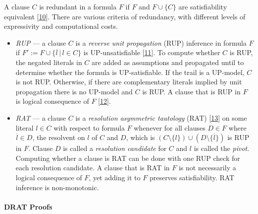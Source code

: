 \documentclass[
]{report}
\begin{document}
A clause \(C\) is redundant in a formula \(F\) if \(F\) and
\(F \cup \{C\}\) are satisfiability equivalent
{[}\protect\hyperlink{ref-DBLP:confux2fcadeux2fHeuleKB17}{10}{]}. There
are various criteria of redundancy, with different levels of
expressivity and computational costs.

\begin{itemize}
\item
  \emph{RUP} --- a clause \(C\) is a \emph{reverse unit propagation}
  (RUP) inference in formula \(F\) if
  \(F' := F \cup \{ \overline{l} \,|\, l \in C \}\) is UP-unsatisfiable
  {[}\protect\hyperlink{ref-DBLP:confux2fdateux2fGoldbergN03}{11}{]}. To
  compute whether \(C\) is RUP, the negated literals in \(C\) are added
  as assumptions and propagated until to determine whether the formula
  is UP-satisfiable. If the trail is a UP-model, \(C\) is not RUP.
  Otherwise, if there are complementary literals implied by unit
  propagation there is no UP-model and \(C\) is RUP. A clause that is
  RUP in \(F\) is logical consequence of \(F\)
  {[}\protect\hyperlink{ref-DBLP:confux2fisaimux2fGelder08}{12}{]}.
\item
  \emph{RAT} --- a clause \(C\) is a \emph{resolution asymmetric
  tautology} (RAT)
  {[}\protect\hyperlink{ref-DBLP:confux2fcadeux2fJarvisaloHB12}{13}{]}
  on some literal \(l \in C\) with respect to formula \(F\) whenever for
  all clauses \(D \in F\) where \(\overline{l} \in D\), the resolvent on
  \(l\) of \(C\) and \(D\), which is
  \((C \setminus \{l\}) \cup (D \setminus \{\overline{l}\})\) is RUP in
  \(F\). Clause \(D\) is called a \emph{resolution candidate} for \(C\)
  and \(l\) is called the \emph{pivot}. Computing whether a clause is
  RAT can be done with one RUP check for each resolution candidate. A
  clause that is RAT in \(F\) is not necessarily a logical consequence
  of \(F\), yet adding it to \(F\) preserves satisfiability. RAT
  inference is non-monotonic.
\end{itemize}

\paragraph{DRAT Proofs}
\end{document}
